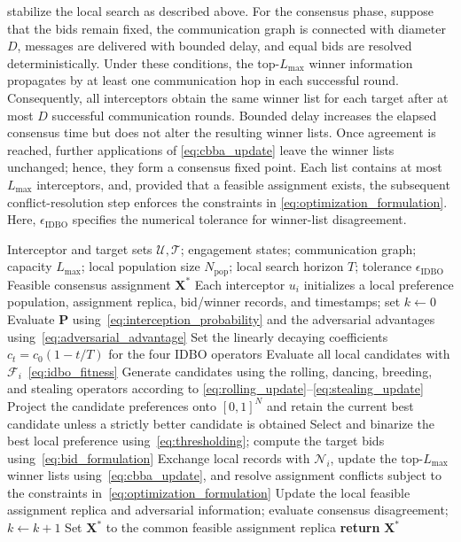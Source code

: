 \documentclass[lettersize,journal]{IEEEtran}
\begin{document}
stabilize the local search as described above. For the consensus phase,
suppose that the bids remain fixed, the communication graph is connected
with diameter $D$, messages are delivered with bounded delay, and equal bids
are resolved deterministically. Under these conditions, the top-$L_{\max}$
winner information propagates by at least one communication hop in each
successful round. Consequently, all interceptors obtain the same winner list
for each target after at most $D$ successful communication rounds. Bounded
delay increases the elapsed consensus time but does not alter the resulting
winner lists. Once agreement is reached, further applications of
\eqref{eq:cbba_update} leave the winner lists unchanged; hence, they form a
consensus fixed point. Each list contains at most $L_{\max}$ interceptors, and,
provided that a feasible assignment exists, the subsequent conflict-resolution
step enforces the constraints in \eqref{eq:optimization_formulation}. Here,
$\epsilon_{\mathrm{IDBO}}$ specifies the numerical tolerance for winner-list
disagreement.



\begin{algorithm}[!t]
\caption{IDBO Target Assignment}
\label{alg:idbo}
\begin{algorithmic}[1]
\REQUIRE Interceptor and target sets $\mathcal{U},\mathcal{T}$; engagement states; communication graph; capacity $L_{\max}$; local population size $N_{\mathrm{pop}}$; local search horizon $T$; tolerance $\epsilon_{\mathrm{IDBO}}$
\ENSURE Feasible consensus assignment $\mathbf{X}^{\ast}$
\STATE Each interceptor $u_i$ initializes a local preference population, assignment replica, bid/winner records, and timestamps; set $k\!\leftarrow\!0$
\REPEAT
  \STATE Evaluate $\mathbf{P}$ using~\eqref{eq:interception_probability} and the adversarial advantages using~\eqref{eq:adversarial_advantage}
    \STATE Set the linearly decaying coefficients $c_t=c_0(1-t/T)$ for the four IDBO operators
    \STATE Evaluate all local candidates with $\mathcal{F}_i$~\eqref{eq:idbo_fitness}
    \STATE Generate candidates using the rolling, dancing, breeding, and stealing operators according to \eqref{eq:rolling_update}--\eqref{eq:stealing_update}
    \STATE Project the candidate preferences onto $[0,1]^N$ and retain the current best candidate unless a strictly better candidate is obtained
  \ENDFOR
  \STATE Select and binarize the best local preference using~\eqref{eq:thresholding}; compute the target bids using~\eqref{eq:bid_formulation}
  \STATE Exchange local records with $\mathcal{N}_i$, update the top-$L_{\max}$ winner lists using~\eqref{eq:cbba_update}, and resolve assignment conflicts subject to the constraints in~\eqref{eq:optimization_formulation}
  \STATE Update the local feasible assignment replica and adversarial information; evaluate consensus disagreement; $k\!\leftarrow\!k+1$
\STATE Set $\mathbf{X}^{\ast}$ to the common feasible assignment replica
\STATE \textbf{return} $\mathbf{X}^{\ast}$
\end{algorithmic}
\end{algorithm}
\end{document}
